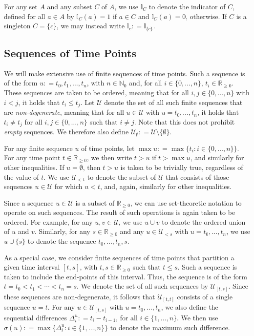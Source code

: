 \documentclass[10pt,a4paper]{paper}
\theoremstyle{definition}
\newcommand{\nats}{\mathbb{N}}
\newcommand{\natswith}{\nats_{0}}
\newcommand{\reals}{\mathbb{R}}
\newcommand{\realsnonneg}{\reals_{\geq 0}}
\newcommand{\ind}[1]{\mathbb{I}_{#1}}
\newcommand{\coloneqq}{:\!=}
\begin{document}
For any set $A$ and any subset $C$ of $A$, we use $\ind{C}$ to denote the indicator of $C$, defined for all $a\in A$ by $\ind{C}(a)=1$ if $a\in C$ and $\ind{C}(a)=0$, otherwise. If $C$ is a singleton $C=\{c\}$, we may instead write $\ind{c}\coloneqq\ind{\{c\}}$.

\subsection{Sequences of Time Points}

We will make extensive use of finite sequences of time points. Such a sequence is of the form $u\coloneqq t_0,t_1,\ldots,t_n$, with $n\in\natswith$ and, for all $i\in\{0,\ldots,n\}$, $t_i\in\realsnonneg$. These sequences are taken to be ordered, meaning that for all $i,j\in\{0,\ldots,n\}$ with $i<j$, it holds that $t_i\leq t_j$. Let $\mathcal{U}$ denote the set of all such finite sequences that are \emph{non-degenerate}, meaning that for all $u\in\mathcal{U}$ with $u=t_0,\ldots,t_n$, it holds that $t_i\neq t_j$ for all $i,j\in\{0,\ldots,n\}$ such that $i\neq j$. Note that this does not prohibit \emph{empty} sequences. We therefore also define $\mathcal{U}_\emptyset\coloneqq \mathcal{U}\setminus\{\emptyset\}$.

For any finite sequence $u$ of time points, let $\max u\coloneqq \max\{t_i:i\in\{0,\ldots,n\}\}$. For any time point $t\in\realsnonneg$, we then write $t>u$ if $t>\max u$, and similarly for other inequalities. If $u=\emptyset$, then $t>u$ is taken to be trivially true, regardless of the value of $t$. We use $\mathcal{U}_{<t}$ to denote the subset of $\mathcal{U}$ that consists of those sequences $u\in\mathcal{U}$ for which $u<t$, and, again, similarly for other inequalities.

Since a sequence $u\in\mathcal{U}$ is a subset of $\realsnonneg$, we can use set-theoretic notation to operate on such sequences. The result of such operations is again taken to be ordered. For example, for any $u,v\in\mathcal{U}$, we use $u\cup v$ to denote the ordered union of $u$ and $v$. Similarly, for any $s\in\realsnonneg$ and any $u\in\mathcal{U}_{<s}$ with $u=t_0,\ldots,t_n$, we use $u\cup\{s\}$ to denote the sequence $t_0,\ldots,t_n,s$.

As a special case, we consider finite sequences of time points that partition a given time interval $[t,s]$, with $t,s\in\realsnonneg$ such that $t\leq s$. Such a sequence is taken to include the end-points of this interval.  Thus, the sequence is of the form $t=t_0< t_1<\cdots< t_n=s$. We denote the set of all such sequences by $\mathcal{U}_{[t,s]}$. Since these sequences are non-degenerate, it follows that $\mathcal{U}_{[t,t]}$ consists of a single sequence $u=t$. For any $u\in\mathcal{U}_{[t,s]}$ with $u=t_0,\ldots,t_n$, we also define the sequential differences $\Delta_i^u\coloneqq t_i-t_{i-1}$, for all $i\in\{1,\ldots,n\}$. We then use $\sigma(u)\coloneqq \max\{\Delta_i^u:i\in\{1,\ldots,n\}\}$ to denote the maximum such difference.
\end{document}
